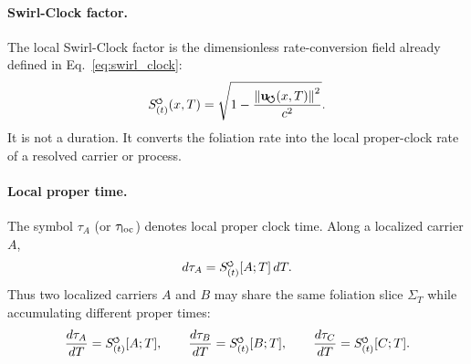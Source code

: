 \documentclass[11pt]{article}
\theoremstyle{definition}
\theoremstyle{plain}
\theoremstyle{remark}
\newcommand{\swirlarrow}{\mathchoice{\mkern-2mu\scriptstyle\boldsymbol{\circlearrowleft}}{\mkern-2mu\scriptstyle\boldsymbol{\circlearrowleft}}{\mkern-2mu\scriptscriptstyle\boldsymbol{\circlearrowleft}}{\mkern-2mu\scriptscriptstyle\boldsymbol{\circlearrowleft}}}
\newcommand{\SwirlClock}{{S_{(t)}^{\swirlarrow}}}
\newcommand{\uswirl}{\mathbf{u}_{\!\boldsymbol{\circlearrowleft}}}
\begin{document}
        \paragraph{Swirl-Clock factor.}
        The local Swirl-Clock factor is the dimensionless rate-conversion field
        already defined in Eq.~\eqref{eq:swirl_clock}:
        \begin{align}
            \SwirlClock(x,T)
            =
            \sqrt{
                1
                -
                \frac{
                    \left\|
                    \uswirl(x,T)
                    \right\|^2
                }{c^2}
            } .
            \label{eq:canonical_time_ontology_swirl_clock}
        \end{align}
        It is not a duration.  It converts the foliation rate into the local
        proper-clock rate of a resolved carrier or process.

        \paragraph{Local proper time.}
        The symbol \(\tau_A\) (or \(\tau_{\rm loc}\)) denotes local proper clock time.  Along a localized
        carrier \(A\),
        \begin{align}
            d\tau_A
            =
            \SwirlClock[A;T]\,dT .
            \label{eq:canonical_time_ontology_local_tau}
        \end{align}
        Thus two localized carriers \(A\) and \(B\) may share the same foliation
        slice \(\Sigma_T\) while accumulating different proper times:
        \begin{align}
            \frac{d\tau_A}{dT}=\SwirlClock[A;T],
            \qquad
            \frac{d\tau_B}{dT}=\SwirlClock[B;T],
            \qquad
            \frac{d\tau_C}{dT}=\SwirlClock[C;T].
            \label{eq:absolute_T_local_tau_layers}
        \end{align}
\end{document}
